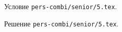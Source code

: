 \problem
Условие \texttt{pers-combi/senior/5.tex}.

\solution Решение \texttt{pers-combi/senior/5.tex}.
\endproblem
